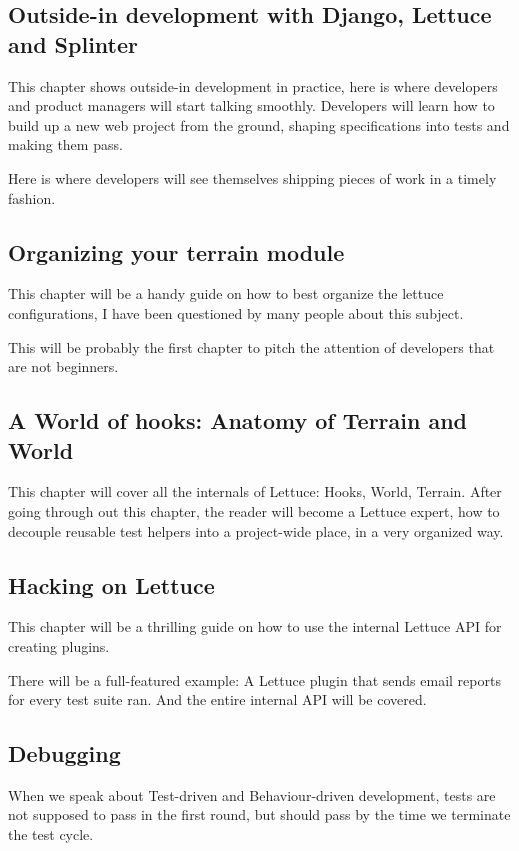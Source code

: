 \documentclass[letterpaper]{article}
\begin{document}
\subsection*{Outside-in development with Django, Lettuce and Splinter}
This chapter shows outside-in development in practice, here is where
developers and product managers will start talking smoothly.
Developers will learn how to build up a new web project from the
ground, shaping specifications into tests and making them pass.

Here is where developers will see themselves shipping pieces of work in a timely fashion.

\subsection*{Organizing your terrain module}
This chapter will be a handy guide on how to best organize the lettuce
configurations, I have been questioned by many people about this subject.

\noindent
This will be probably the first chapter to pitch the attention of
developers that are not beginners.

\subsection*{A World of hooks: Anatomy of Terrain and World}
This chapter will cover all the internals of Lettuce: Hooks, World,
Terrain.  After going through out this chapter, the reader will become
a Lettuce expert, how to decouple reusable test helpers into a
project-wide place, in a very organized way.

\subsection*{Hacking on Lettuce}
This chapter will be a thrilling guide on how to use the internal
Lettuce API for creating plugins.

There will be a full-featured example: A Lettuce plugin that sends
email reports for every test suite ran.
And the entire internal API will be covered.

\subsection*{Debugging}
When we speak about Test-driven and Behaviour-driven development,
tests are not supposed to pass in the first round, but should pass by
the time we terminate the test cycle.
\end{document}
